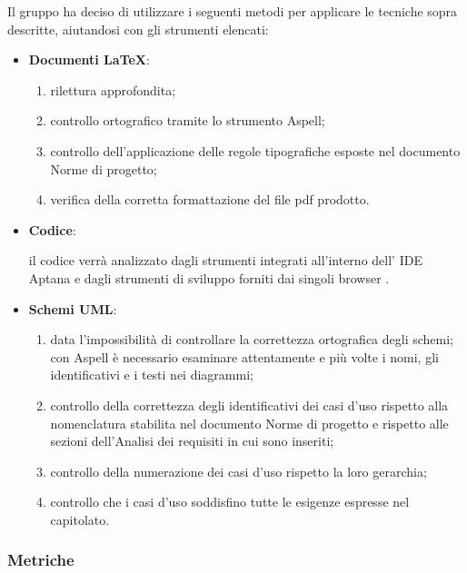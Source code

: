 Il gruppo ha deciso di utilizzare i seguenti metodi per applicare le tecniche sopra
descritte, aiutandosi con gli strumenti elencati:
\begin{itemize}
\item \textbf{Documenti \LaTeX}:
\begin{enumerate}
\item rilettura approfondita;
\item controllo ortografico tramite lo strumento Aspell;
\item controllo dell'applicazione delle regole tipografiche esposte nel documento Norme di progetto;
\item verifica della corretta formattazione del file pdf prodotto.
\end{enumerate}

\item \textbf{Codice}:
 
il codice verrà analizzato dagli strumenti integrati all'interno dell' IDE Aptana e dagli strumenti di sviluppo forniti dai singoli browser .

\item \textbf{Schemi UML}:
\begin{enumerate}


\item data l'impossibilità di controllare la correttezza ortografica degli schemi;
con Aspell è necessario esaminare attentamente e più   volte i nomi, gli identificativi e i testi nei diagrammi;
\item controllo della correttezza degli identificativi dei casi d'uso rispetto alla nomenclatura stabilita nel documento Norme di progetto e rispetto alle sezioni dell'Analisi dei requisiti in cui sono inseriti;
\item controllo della numerazione dei casi d'uso rispetto la loro gerarchia;
\item controllo che i casi d'uso soddisfino tutte le esigenze espresse nel capitolato.
\end{enumerate}
\end{itemize}
\subsubsection{Metriche}

